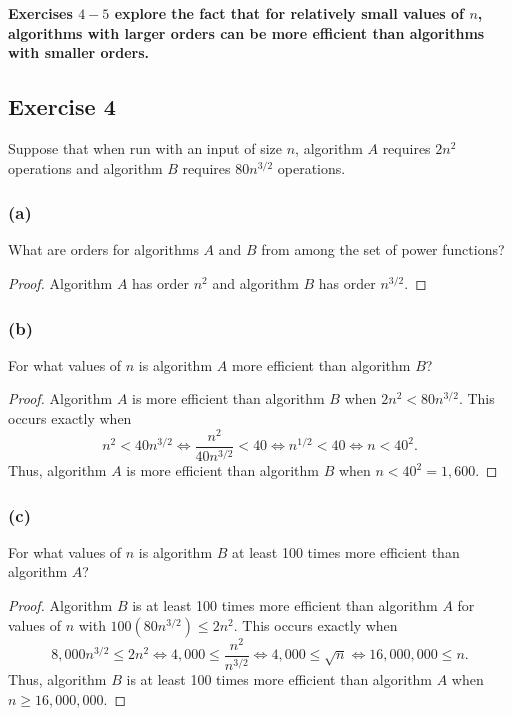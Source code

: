 \documentclass[14pt]{extarticle}
\newcommand{\cy}{\color{cyan}}
\begin{document}
{\bf \cy Exercises \(4-5\) explore the fact that for relatively small values of \(n\), algorithms with larger
orders can be more efficient than algorithms with smaller orders.}

\subsection{Exercise 4}
Suppose that when run with an input of size \(n\), algorithm \(A\) requires \(2n^2\) operations and algorithm \(B\) requires
\(80n^{3/2}\) operations.

\subsubsection{(a)}
What are orders for algorithms \(A\) and \(B\) from among the set of power functions?

\begin{proof}
    Algorithm \(A\) has order \(n^2\) and algorithm \(B\) has order \(n^{3/2}\).
\end{proof}

\subsubsection{(b)}
For what values of \(n\) is algorithm \(A\) more efficient than algorithm \(B\)?

\begin{proof}
    Algorithm \(A\) is more efficient than algorithm \(B\) when \(2n^2 < 80n^{3/2}\). This occurs exactly when
    \[
        n^2 < 40n^{3/2} \iff \frac{n^2}{40n^{3/2}} < 40 \iff n^{1/2} < 40 \iff n < 40^2.
    \]
    Thus, algorithm \(A\) is more efficient than algorithm \(B\) when \(n < 40^2 = 1,600\).
\end{proof}

\subsubsection{(c)}
For what values of \(n\) is algorithm \(B\) at least 100 times more efficient than algorithm \(A\)?

\begin{proof}
    Algorithm \(B\) is at least 100 times more efficient than algorithm \(A\) for values of \(n\) with \(100(80n^{3/2}) \leq
    2n^2\). This occurs exactly when
    \[
        8,000n^{3/2} \leq 2n^2 \iff 4,000 \leq \frac{n^2}{n^{3/2}} \iff 4,000 \leq \sqrt{n} \iff 16,000,000 \leq n.
    \]
    Thus, algorithm \(B\) is at least 100 times more efficient than algorithm \(A\) when \(n \geq 16,000,000\).
\end{proof}
\end{document}
